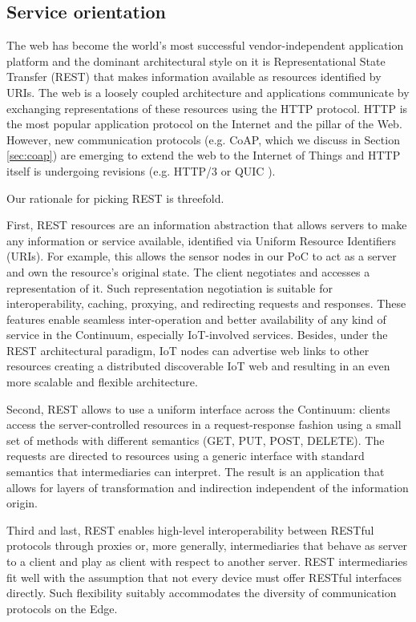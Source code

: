 \subsection{Service orientation}

The web has become the world's most successful vendor-independent application platform and the dominant architectural style on it is Representational State Transfer (REST) \cite{rest} that makes information available as resources identified by URIs. The web is a loosely coupled architecture and applications communicate by exchanging representations of these resources using the HTTP protocol. HTTP is the most popular application protocol on the Internet and the pillar of the Web. However, new communication protocols (e.g. CoAP, which we discuss in Section \ref{sec:coap}) are emerging to extend the web to the Internet of Things and HTTP itself is undergoing revisions (e.g. HTTP/3 or QUIC \cite{langley2017quic}).

Our rationale for picking REST is threefold.\par
First, REST resources are an information abstraction that allows servers to make any information or service available, identified via Uniform Resource Identifiers (URIs). For example, this allows the sensor nodes in our PoC to act as a server and own the resource's original state. The client negotiates and accesses a representation of it. Such representation negotiation is suitable for interoperability, caching, proxying, and redirecting requests and responses. These features enable seamless inter-operation and better availability of any kind of service in the Continuum, especially IoT-involved services. Besides, under the REST architectural paradigm, IoT nodes can advertise web links to other resources creating a distributed discoverable IoT web and resulting in an even more scalable and flexible architecture.\par
Second, REST allows to use a uniform interface across the Continuum: clients access the server-controlled resources in a request-response fashion using a small set of methods with different semantics (GET, PUT, POST, DELETE). The requests are directed to resources using a generic interface with standard semantics that intermediaries can interpret. The result is an application that allows for layers of transformation and indirection independent of the information origin. \par
Third and last, REST enables high-level interoperability between RESTful protocols through proxies or, more generally, intermediaries that behave as server to a client and play as client with respect to another server. REST intermediaries fit well with the assumption that not every device must offer RESTful interfaces directly. Such flexibility suitably accommodates the diversity of communication protocols on the Edge.

